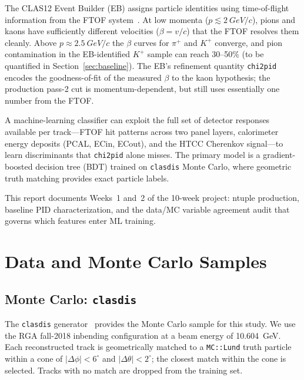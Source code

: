 \documentclass[11pt]{article}
\newcommand{\Kp}{K^{+}}
\newcommand{\pip}{\pi^{+}}
\begin{document}
The CLAS12 Event Builder (EB) assigns particle identities using time-of-flight
information from the FTOF system~\cite{Carman2020}.
At low momenta ($p \lesssim \SI{2}{GeV/c}$), pions and kaons have
sufficiently different velocities ($\beta = v/c$) that the FTOF resolves them
cleanly.
Above $p \approx \SI{2.5}{GeV/c}$ the $\beta$ curves for $\pip$ and $\Kp$
converge, and pion contamination in the EB-identified $\Kp$ sample can reach
30--50\% (to be quantified in Section~\ref{sec:baseline}).
The EB's refinement quantity \texttt{chi2pid} encodes the goodness-of-fit of
the measured $\beta$ to the kaon hypothesis; the production pass-2 cut is
momentum-dependent, but still uses essentially one number from the FTOF.

A machine-learning classifier can exploit the full set of detector responses
available per track---FTOF hit patterns across two panel layers, calorimeter
energy deposits (PCAL, ECin, ECout), and the HTCC Cherenkov signal---to learn
discriminants that \texttt{chi2pid} alone misses.
The primary model is a gradient-boosted decision tree (BDT) trained on
\texttt{clasdis} Monte Carlo, where geometric truth matching provides exact
particle labels.

This report documents Weeks~1 and~2 of the 10-week project:
ntuple production, baseline PID characterization, and the data/MC variable
agreement audit that governs which features enter ML training.

\section{Data and Monte Carlo Samples}
\label{sec:samples}

\subsection{Monte Carlo: \texttt{clasdis}}
The \texttt{clasdis} generator~\cite{Burkert2020} provides the Monte Carlo
sample for this study.
We use the RGA fall-2018 inbending configuration at a beam energy of
\SI{10.604}{GeV}.
Each reconstructed track is geometrically matched to a \texttt{MC::Lund} truth
particle within a cone of $|\Delta\phi| < 6^\circ$ and
$|\Delta\theta| < 2^\circ$; the closest match within the cone is selected.
Tracks with no match are dropped from the training set.
\end{document}
